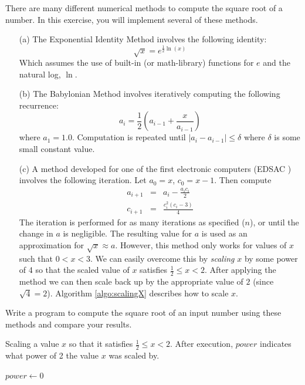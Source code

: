 \begin{exer}
\label{exercise:loops:squareRoots}
There are many different numerical methods to compute the square root of a number.  In
this exercise, you will implement several of these methods.

\begin{enumerate}
  \item[(a)] The Exponential Identity Method involves the following identity:
           $$\sqrt{x} = e^{\frac{1}{2}\ln{(x)}}$$
	Which assumes the use of built-in (or math-library) functions for $e$ and the natural log, $\ln$.
  \item[(b)] The Babylonian Method involves iteratively computing the following recurrence:
	$$a_{i} = \frac{1}{2}\left( a_{i-1} + \frac{x}{a_{i-1}} \right)$$
	where $a_1 = 1.0$.  Computation is repeated until $|a_{i} - a_{i-1}| \leq \delta$ where 
	$\delta$ is some small constant value.
  \item[(c)] A method developed for one of the first electronic computers (EDSAC \cite{WilkesWheelerGill1952}) involves the following iteration.
	Let $a_0 = x$, $c_0 = x-1$.  Then compute
	$$\begin{array}{rcl}
	    a_{i+1} & = & a_i - \frac{a_ic_i}{2} \\
	    c_{i+1} & = & \frac{c_i^2(c_i - 3)}{4} 
 	\end{array}$$
	The iteration is performed for as many iterations as specified ($n$), or until the change in $a$ is negligible.
	The resulting value for $a$ is used as an approximation for $\sqrt{x} \approx a$.
	However, this method only works for values of $x$ such that $0 < x < 3$.  
	We can easily overcome this by \emph{scaling} $x$ by some power of 4 so that
	the scaled value of $x$ satisfies $\frac{1}{2} \leq x < 2$.  After applying the method we
	can then scale back up by the appropriate value of $2$ (since $\sqrt{4} = 2$).  
	Algorithm \ref{algo:scalingX} describes how to scale $x$.
\end{enumerate}

Write a program to compute the square root of an input number using 
these methods and compare your results.

\begin{algorithm}[H]
\caption{Scaling a value $x$ so that it satisfies $\frac{1}{2} \leq x < 2$.  After
execution, $power$ indicates what power of 2 the value $x$ was scaled by.}
\label{algo:scalingX}
$power \leftarrow 0$ \;
\end{algorithm}

\end{exer}

